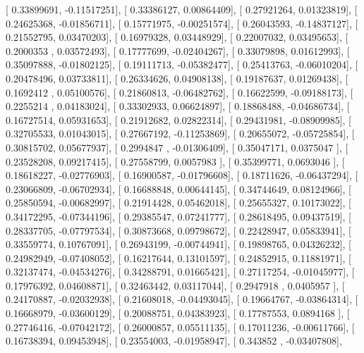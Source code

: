 \documentclass{article}
\begin{document}
       [ 0.33899691, -0.11517251],
       [ 0.33386127,  0.00864409],
       [ 0.27921264,  0.01323819],
       [ 0.24625368, -0.01856711],
       [ 0.15771975, -0.00251574],
       [ 0.26043593, -0.14837127],
       [ 0.21552795,  0.03470203],
       [ 0.16979328,  0.03448929],
       [ 0.22007032,  0.03495653],
       [ 0.2000353 ,  0.03572493],
       [ 0.17777699, -0.02404267],
       [ 0.33079898,  0.01612993],
       [ 0.35097888, -0.01802125],
       [ 0.19111713, -0.05382477],
       [ 0.25413763, -0.06010204],
       [ 0.20478496,  0.03733811],
       [ 0.26334626,  0.04908138],
       [ 0.19187637,  0.01269438],
       [ 0.1692412 ,  0.05100576],
       [ 0.21860813, -0.06482762],
       [ 0.16622599, -0.09188173],
       [ 0.2255214 ,  0.04183024],
       [ 0.33302933,  0.06624897],
       [ 0.18868488, -0.04686734],
       [ 0.16727514,  0.05931653],
       [ 0.21912682,  0.02822314],
       [ 0.29431981, -0.08909985],
       [ 0.32705533,  0.01043015],
       [ 0.27667192, -0.11253869],
       [ 0.20655072, -0.05725854],
       [ 0.30815702,  0.05677937],
       [ 0.2994847 , -0.01306409],
       [ 0.35047171,  0.0375047 ],
       [ 0.23528208,  0.09217415],
       [ 0.27558799,  0.0057983 ],
       [ 0.35399771,  0.0693046 ],
       [ 0.18618227, -0.02776903],
       [ 0.16900587, -0.01796608],
       [ 0.18711626, -0.06437294],
       [ 0.23066809, -0.06702934],
       [ 0.16688848,  0.00644145],
       [ 0.34744649,  0.08124966],
       [ 0.25850594, -0.00682997],
       [ 0.21914428,  0.05462018],
       [ 0.25655327,  0.10173022],
       [ 0.34172295, -0.07344196],
       [ 0.29385547,  0.07241777],
       [ 0.28618495,  0.09437519],
       [ 0.28337705, -0.07797534],
       [ 0.30873668,  0.09798672],
       [ 0.22428947,  0.05833941],
       [ 0.33559774,  0.10767091],
       [ 0.26943199, -0.00744941],
       [ 0.19898765,  0.04326232],
       [ 0.24982949, -0.07408052],
       [ 0.16217644,  0.13101597],
       [ 0.24852915,  0.11881971],
       [ 0.32137474, -0.04534276],
       [ 0.34288791,  0.01665421],
       [ 0.27117254, -0.01045977],
       [ 0.17976392,  0.04608871],
       [ 0.32463442,  0.03117044],
       [ 0.2947918 ,  0.0405957 ],
       [ 0.24170887, -0.02032938],
       [ 0.21608018, -0.04493045],
       [ 0.19664767, -0.03864314],
       [ 0.16668979, -0.03600129],
       [ 0.20088751,  0.04383923],
       [ 0.17787553,  0.0894168 ],
       [ 0.27746416, -0.07042172],
       [ 0.26000857,  0.05511135],
       [ 0.17011236, -0.00611766],
       [ 0.16738394,  0.09453948],
       [ 0.23554003, -0.01958947],
       [ 0.343852  , -0.03407808],
\end{document}
